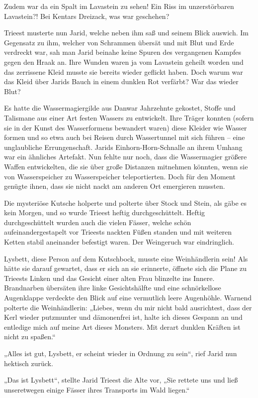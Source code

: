 Zudem war da ein Spalt im Lavastein zu sehen! Ein Riss im unzerstörbaren Lavastein?! Bei Kentars Dreizack, was war geschehen?

Trieest musterte nun Jarid, welche neben ihm saß und seinem Blick auswich. Im Gegensatz zu ihm, welcher von Schrammen übersät und mit Blut und Erde verdreckt war, sah man Jarid beinahe keine Spuren des vergangenen Kampfes gegen den Hraak an. Ihre Wunden waren ja vom Lavastein geheilt worden und das zerrissene Kleid musste sie bereits wieder geflickt haben. Doch warum war das Kleid über Jarids Bauch in einem dunklen Rot verfärbt? War das wieder Blut?

Es hatte die Wassermagiergilde aus Danwar Jahrzehnte gekostet, Stoffe und Talismane aus einer Art festen Wassers zu entwickelt. Ihre Träger konnten (sofern sie in der Kunst des Wasserformens bewandert waren) diese Kleider wie Wasser formen und so etwa auch bei Reisen durch Wassertunnel mit sich führen – eine unglaubliche Errungenschaft. Jarids Einhorn-Horn-Schnalle an ihrem Umhang war ein ähnliches Artefakt. Nun fehlte nur noch, dass die Wassermagier größere Waffen entwickelten, die sie über große Distanzen mitnehmen könnten, wenn sie von Wasserspeicher zu Wasserspeicher teleportierten. Doch für den Moment genügte ihnen, dass sie nicht nackt am anderen Ort emergieren mussten.

Die mysteriöse Kutsche holperte und polterte über Stock und Stein, als gäbe es kein Morgen, und so wurde Trieest heftig durchgeschüttelt. Heftig durchgeschüttelt wurden auch die vielen Fässer, welche schön aufeinandergestapelt vor Trieests nackten Füßen standen und mit weiteren Ketten stabil aneinander befestigt waren. Der Weingeruch war eindringlich.

Lysbett, diese Person auf dem Kutschbock, musste eine Weinhändlerin sein! Als hätte sie darauf gewartet, dass er sich an sie erinnerte, öffnete sich die Plane zu Trieests Linken und das Gesicht einer alten Frau blinzelte ins Innere. Brandnarben übersäten ihre linke Gesichtshälfte und eine schnörkellose Augenklappe verdeckte den Blick auf eine vermutlich leere Augenhöhle. Warnend polterte die Weinhändlerin: „Liebes, wenn du mir nicht bald ausrichtest, dass der Kerl wieder putzmunter und dämonenfrei ist, halte ich dieses Gespann an und entledige mich auf meine Art dieses Monsters. Mit derart dunklen Kräften ist nicht zu spaßen.“

„Alles ist gut, Lysbett, er scheint wieder in Ordnung zu sein“, rief Jarid nun hektisch zurück.

„Das ist Lysbett“, stellte Jarid Trieest die Alte vor, „Sie rettete uns und ließ unseretwegen einige Fässer ihres Transports im Wald liegen.“

